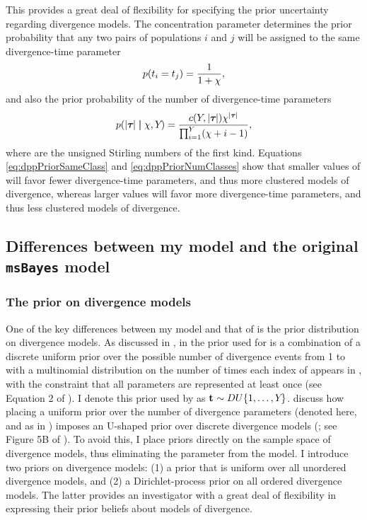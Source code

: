 \begin{linenomath}
This provides a great deal of flexibility for specifying the prior uncertainty
regarding divergence models.
The concentration parameter \concentrationParam determines the prior
probability that any two pairs of populations $i$ and $j$ will be assigned to
the same divergence-time parameter
\begin{equation}
    p(t_{i} = t_{j}) = \frac{1}{1 + \chi},
    \label{eq:dppPriorSameClass}
\end{equation}
and also the prior probability of the number of divergence-time parameters
\begin{equation}
    p(\lvert \boldsymbol{\tau_{}} \rvert \boldsymbol{\mid} \chi, Y_{}) = 
    \frac{c(Y_{}, \lvert \boldsymbol{\tau_{}} \rvert) \chi^{\lvert \boldsymbol{\tau_{}} \rvert}}
    {\prod_{i=1}^{Y_{}}(\chi + i - 1)},
    \label{eq:dppPriorNumClasses}
\end{equation}
where \stirlingFirst{\cdot}{\cdot} are the unsigned Stirling numbers of the
first kind.
Equations \ref{eq:dppPriorSameClass} and \ref{eq:dppPriorNumClasses} show that
smaller values of \concentrationParam will favor fewer divergence-time
parameters, and thus more clustered models of divergence, whereas larger values
will favor more divergence-time parameters, and thus less clustered models of
divergence.
\end{linenomath}

\subsection{Differences between my model and the original \texttt{msBayes} model}
\subsubsection{The prior on divergence models}
One of the key differences between my model and that of \msb \citep{Huang2011}
is the prior distribution on divergence models.
As discussed in \citet{Oaks2012}, in \msb the prior used for
\divTimeIndexVector is a combination of a discrete uniform prior over the
possible number of divergence events \divTimeNum from 1 to \npairs{} with a
multinomial distribution on the number of times each index of \divTimeVector
appears in \divTimeIndexVector, with the constraint that all \divTime{}
parameters are represented at least once (see Equation 2 of \citet{Oaks2012}).
I denote this prior used by \msb as $\mathbf{t_{}} \sim DU\{1, \ldots, Y_{}\}$.
\citet{Oaks2012} discuss how placing a uniform prior over the number of
divergence parameters (denoted \divTimeNum here, and as \numt{} in
\citet{Huang2011}) imposes an U-shaped prior over discrete divergence
models (\divTimeIndexVector; see
Figure 5B of \citet{Oaks2012}).
To avoid this, I place priors directly on the sample space of divergence
models, thus eliminating the parameter \numt{} from the model.
I introduce two priors on divergence models:
(1) a prior that is uniform over all unordered divergence models, and
(2) a Dirichlet-process prior on all ordered divergence models.
The latter provides an investigator with a great deal of flexibility in
expressing their prior beliefs about models of divergence.

